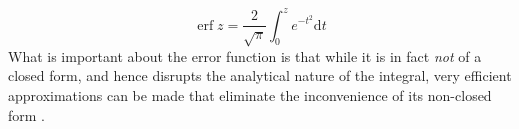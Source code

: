 \begin{equation}
\operatorname{erf} z=\frac{2}{\sqrt{\pi}} \int_{0}^{z} e^{-t^{2}} \mathrm{d} t
\end{equation}
What is important about the error function is that while it is in fact \textit{not} of a closed form, and hence disrupts the analytical nature of the integral, very efficient approximations can be made that eliminate the inconvenience of its non-closed form \cite{Ren2007Closed-formScience}.
